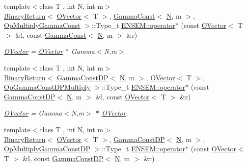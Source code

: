 \begin{DoxyCompactItemize}
{\footnotesize template$<$class T , int N, int m$>$ }\\\mbox{\hyperlink{structENSEM_1_1BinaryReturn}{Binary\+Return}}$<$ \mbox{\hyperlink{classENSEM_1_1OVector}{O\+Vector}}$<$ T $>$, \mbox{\hyperlink{classENSEM_1_1GammaConst}{Gamma\+Const}}$<$ \mbox{\hyperlink{operator__name__util_8cc_a7722c8ecbb62d99aee7ce68b1752f337}{N}}, m $>$, \mbox{\hyperlink{structENSEM_1_1OpMultiplyGammaConst}{Op\+Multiply\+Gamma\+Const}} $>$\+::Type\+\_\+t \mbox{\hyperlink{group__obsvector_ga4cead70d208b90a7a2b58aa6251d78b0}{E\+N\+S\+E\+M\+::operator$\ast$}} (const \mbox{\hyperlink{classENSEM_1_1OVector}{O\+Vector}}$<$ T $>$ \&l, const \mbox{\hyperlink{classENSEM_1_1GammaConst}{Gamma\+Const}}$<$ \mbox{\hyperlink{operator__name__util_8cc_a7722c8ecbb62d99aee7ce68b1752f337}{N}}, m $>$ \&r)
\begin{DoxyCompactList}\small\item\em \mbox{\hyperlink{classENSEM_1_1OVector}{O\+Vector}} = \mbox{\hyperlink{classENSEM_1_1OVector}{O\+Vector}} $\ast$ Gamma$<$\+N,m$>$ \end{DoxyCompactList}\item 
{\footnotesize template$<$class T , int N, int m$>$ }\\\mbox{\hyperlink{structENSEM_1_1BinaryReturn}{Binary\+Return}}$<$ \mbox{\hyperlink{classENSEM_1_1GammaConstDP}{Gamma\+Const\+DP}}$<$ \mbox{\hyperlink{operator__name__util_8cc_a7722c8ecbb62d99aee7ce68b1752f337}{N}}, m $>$, \mbox{\hyperlink{classENSEM_1_1OVector}{O\+Vector}}$<$ T $>$, \mbox{\hyperlink{structENSEM_1_1OpGammaConstDPMultiply}{Op\+Gamma\+Const\+D\+P\+Multiply}} $>$\+::Type\+\_\+t \mbox{\hyperlink{group__obsvector_gaa96dcdea35ea89a0405ab2273dfaa9a9}{E\+N\+S\+E\+M\+::operator$\ast$}} (const \mbox{\hyperlink{classENSEM_1_1GammaConstDP}{Gamma\+Const\+DP}}$<$ \mbox{\hyperlink{operator__name__util_8cc_a7722c8ecbb62d99aee7ce68b1752f337}{N}}, m $>$ \&l, const \mbox{\hyperlink{classENSEM_1_1OVector}{O\+Vector}}$<$ T $>$ \&r)
\begin{DoxyCompactList}\small\item\em \mbox{\hyperlink{classENSEM_1_1OVector}{O\+Vector}} = Gamma$<$\+N,m$>$ $\ast$ \mbox{\hyperlink{classENSEM_1_1OVector}{O\+Vector}}. \end{DoxyCompactList}\item 
{\footnotesize template$<$class T , int N, int m$>$ }\\\mbox{\hyperlink{structENSEM_1_1BinaryReturn}{Binary\+Return}}$<$ \mbox{\hyperlink{classENSEM_1_1OVector}{O\+Vector}}$<$ T $>$, \mbox{\hyperlink{classENSEM_1_1GammaConstDP}{Gamma\+Const\+DP}}$<$ \mbox{\hyperlink{operator__name__util_8cc_a7722c8ecbb62d99aee7ce68b1752f337}{N}}, m $>$, \mbox{\hyperlink{structENSEM_1_1OpMultiplyGammaConstDP}{Op\+Multiply\+Gamma\+Const\+DP}} $>$\+::Type\+\_\+t \mbox{\hyperlink{group__obsvector_ga5641b8f1bc373f5f46ec47d9b0640c64}{E\+N\+S\+E\+M\+::operator$\ast$}} (const \mbox{\hyperlink{classENSEM_1_1OVector}{O\+Vector}}$<$ T $>$ \&l, const \mbox{\hyperlink{classENSEM_1_1GammaConstDP}{Gamma\+Const\+DP}}$<$ \mbox{\hyperlink{operator__name__util_8cc_a7722c8ecbb62d99aee7ce68b1752f337}{N}}, m $>$ \&r)

\end{DoxyCompactItemize}

